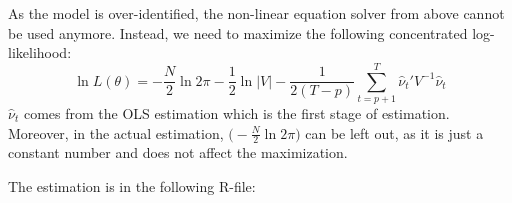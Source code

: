 \begin{enumerate}
\begin{sol}
              As the model is over-identified, the non-linear equation solver from above cannot be used anymore. Instead, we need to maximize the following concentrated log-likelihood:
              \[
                  \ln L(\theta) = -\frac{N}{2} \ln 2 \pi
                  - \frac{1}{2} \ln |V|
                  - \frac{1}{2 (T - p)} \sum_{t = p + 1}^T \hat \nu_t' V^{-1} \hat \nu_t
              \]
              $\hat \nu_t$ comes from the OLS estimation which is the first stage of estimation. Moreover, in the actual estimation, $\bigg(-\frac{N}{2} \ln 2 \pi \bigg)$ can be left out, as it is just a constant number and does not affect the maximization.

              The estimation is in the following R-file:
              
          \end{sol}
\end{enumerate}